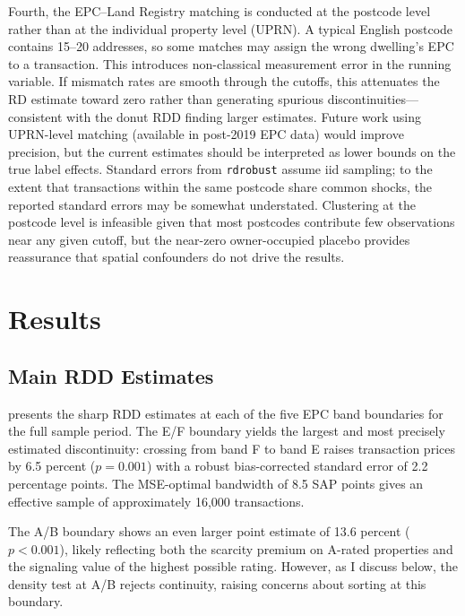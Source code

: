 \documentclass[12pt]{article}
\begin{document}
Fourth, the EPC--Land Registry matching is conducted at the postcode level rather than at the individual property level (UPRN). A typical English postcode contains 15--20 addresses, so some matches may assign the wrong dwelling's EPC to a transaction. This introduces non-classical measurement error in the running variable. If mismatch rates are smooth through the cutoffs, this attenuates the RD estimate toward zero rather than generating spurious discontinuities---consistent with the donut RDD finding larger estimates. Future work using UPRN-level matching (available in post-2019 EPC data) would improve precision, but the current estimates should be interpreted as lower bounds on the true label effects. Standard errors from \texttt{rdrobust} assume iid sampling; to the extent that transactions within the same postcode share common shocks, the reported standard errors may be somewhat understated. Clustering at the postcode level is infeasible given that most postcodes contribute few observations near any given cutoff, but the near-zero owner-occupied placebo provides reassurance that spatial confounders do not drive the results.


\section{Results}\label{sec:results}

\subsection{Main RDD Estimates}

 presents the sharp RDD estimates at each of the five EPC band boundaries for the full sample period. The E/F boundary yields the largest and most precisely estimated discontinuity: crossing from band F to band E raises transaction prices by 6.5 percent ($p = 0.001$) with a robust bias-corrected standard error of 2.2 percentage points. The MSE-optimal bandwidth of 8.5 SAP points gives an effective sample of approximately 16,000 transactions.



The A/B boundary shows an even larger point estimate of 13.6 percent ($p < 0.001$), likely reflecting both the scarcity premium on A-rated properties and the signaling value of the highest possible rating. However, as I discuss below, the density test at A/B rejects continuity, raising concerns about sorting at this boundary.
\end{document}
